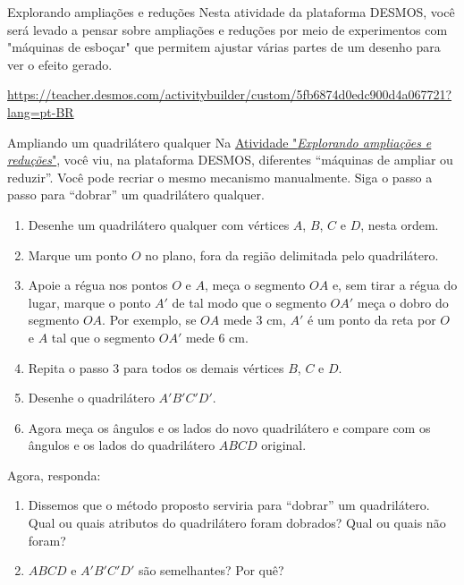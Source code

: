 \begin{task}{Explorando ampliações e reduções}
\label{explorando-ampliacoes}
Nesta atividade da plataforma DESMOS, você será levado a pensar sobre ampliações e reduções por meio de experimentos com "máquinas de esboçar" que permitem ajustar várias partes de um desenho para ver o efeito gerado. 

\url{https://teacher.desmos.com/activitybuilder/custom/5fb6874d0edc900d4a067721?lang=pt-BR}
\end{task}

\begin{task}{Ampliando um quadrilátero qualquer}
Na \hyperref[explorando-ampliacoes]{Atividade "\textit{Explorando ampliações e reduções}"}, você viu, na plataforma DESMOS, diferentes “máquinas de ampliar ou reduzir”. Você pode recriar o mesmo mecanismo manualmente. Siga o passo a passo para “dobrar” um quadrilátero qualquer.
\begin{enumerate}[label=\titem{\arabic*.}]
\item Desenhe um quadrilátero qualquer com vértices $A$, $B$, $C$ e $D$, nesta ordem.  
\item Marque um ponto $O$ no plano, fora da região delimitada pelo quadrilátero. 
\item Apoie a régua nos pontos $O$ e $A$, meça o segmento $OA$ e, sem tirar a régua do lugar, marque o ponto $A'$ de tal modo que o segmento $OA'$ meça o dobro do segmento $OA$. Por exemplo, se $OA$ mede $3$ cm, $A'$ é um ponto da reta por $O$ e $A$ tal que o segmento $OA'$ mede $6$ cm.
\item Repita o passo 3 para todos os demais vértices $B$, $C$ e $D$. 
\item Desenhe o quadrilátero $A'B'C'D'$.
\item  Agora meça os ângulos e os lados do novo quadrilátero e compare com os ângulos e os lados do quadrilátero $ABCD$ original.  
\end{enumerate}

Agora, responda: 
\begin{enumerate}
\item Dissemos que o método proposto serviria para “dobrar” um quadrilátero. Qual ou quais atributos do quadrilátero foram dobrados? Qual ou quais não foram?
\item $ABCD$ e $A'B'C'D'$ são semelhantes? Por quê?
\end{enumerate}
\end{task}


